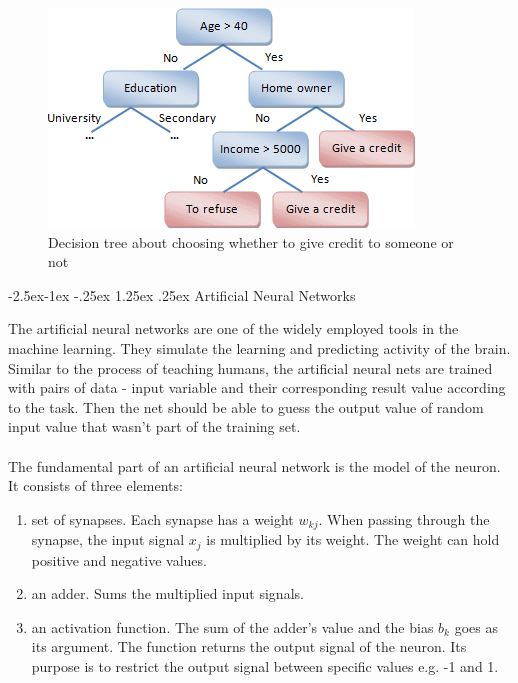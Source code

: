 \documentclass[runningheads,a4paper]{llncs}[2015/06/24]
\makeatletter
\renewcommand\paragraph{\@startsection{paragraph}{4}{\z@}%
            {-2.5ex\@plus -1ex \@minus -.25ex}%
            {1.25ex \@plus .25ex}%
            {\normalfont\normalsize\bfseries}}
\makeatother
\begin{document}
\begin{figure}[h]
\centering
\includegraphics[width=\textwidth]{decisionTree}
\caption{Decision tree about choosing whether to give credit to someone or not}
\label{fig:decisionTree}
\end{figure}
		 
\paragraph{Artificial Neural Networks}
	
The artificial neural networks are one of the widely employed tools in the machine learning. They simulate the learning and predicting activity of the brain. Similar to the process of teaching humans, the artificial neural nets are trained with pairs of data - input variable and their corresponding result value according to the task. Then the net should be able to guess the output value of random input value that wasn't part of the training set. \\\\The  fundamental part of an artificial neural network is the model of the neuron. It consists of three elements\cite{haykin2009neural}:
\vspace{-\topsep}
\begin{enumerate}
\item set of synapses. Each synapse has a weight $w_{kj}$.  When passing through the synapse, the input signal $x_j$ is multiplied by its weight. The weight can hold positive and negative values.
\item an adder. Sums the multiplied input signals. 
\item an activation function. The sum of the adder's value and the bias $b_k$ goes as its argument. The function returns the output signal of the neuron. Its purpose is to restrict the output signal between specific values e.g. -1 and 1.
\end{enumerate}
\vspace{-\topsep}
\end{document}
